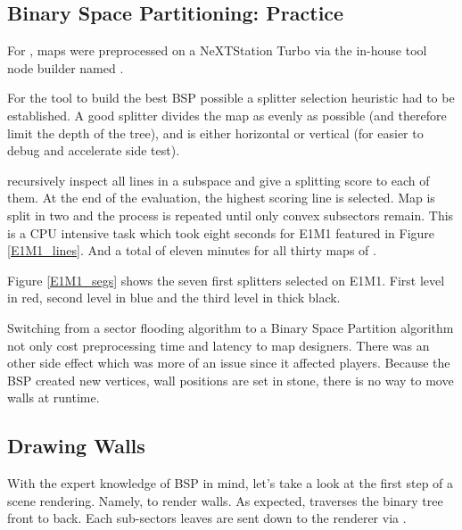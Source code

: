 \subsection{Binary Space Partitioning: Practice}
For \doom, maps were preprocessed on a NeXTStation Turbo via the in-house tool node builder named .\\
\par
For the tool to build the best BSP possible a splitter selection heuristic had to be established. A good splitter divides the map as evenly as possible (and therefore limit the depth of the tree), and is either horizontal or vertical (for easier to debug and accelerate side test).\\
\par
  recursively inspect all lines in a subspace and give a splitting score to each of them. At the end of the evaluation, the highest scoring line is selected. Map is split in two and the process is repeated until only convex subsectors remain. This is a CPU intensive task which took eight seconds for E1M1 featured in Figure \ref{E1M1_lines}. And a total of eleven minutes for all thirty maps of .\\
\par
{}
\par
Figure \ref{E1M1_segs} shows the seven first splitters selected on E1M1. First level in red, second level in blue and the third level in thick black.\\
\par
Switching from a sector flooding algorithm to a Binary Space Partition algorithm not only cost preprocessing time and latency to map designers. There was an other side effect which was more of an issue since it affected players. Because the BSP created new vertices, wall positions are set in stone, there is no way to move walls at runtime.


\par


\subsection{Drawing Walls}
With the expert knowledge of BSP in mind, let's take a look at the first step of a scene rendering. Namely, to render walls. As expected,  traverses the binary tree front to back. Each sub-sectors leaves are sent down to the renderer via .\\
\par
{}
\par


